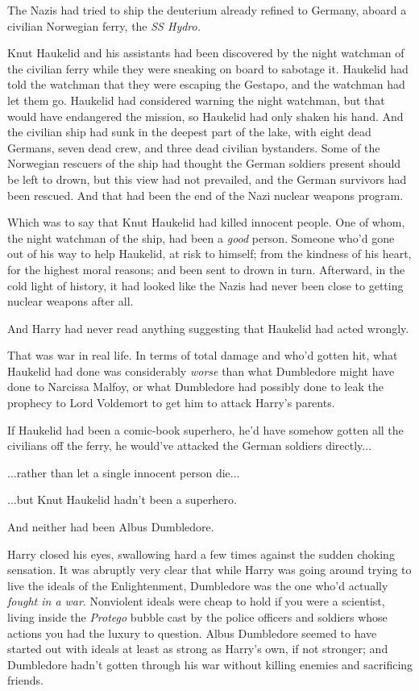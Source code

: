The Nazis had tried to ship the deuterium already refined to Germany, aboard a civilian Norwegian ferry, the \emph{SS Hydro.}

Knut Haukelid and his assistants had been discovered by the night watchman of the civilian ferry while they were sneaking on board to sabotage it. Haukelid had told the watchman that they were escaping the Gestapo, and the watchman had let them go. Haukelid had considered warning the night watchman, but that would have endangered the mission, so Haukelid had only shaken his hand. And the civilian ship had sunk in the deepest part of the lake, with eight dead Germans, seven dead crew, and three dead civilian bystanders. Some of the Norwegian rescuers of the ship had thought the German soldiers present should be left to drown, but this view had not prevailed, and the German survivors had been rescued. And that had been the end of the Nazi nuclear weapons program.

Which was to say that Knut Haukelid had killed innocent people. One of whom, the night watchman of the ship, had been a \emph{good} person. Someone who'd gone out of his way to help Haukelid, at risk to himself; from the kindness of his heart, for the highest moral reasons; and been sent to drown in turn. Afterward, in the cold light of history, it had looked like the Nazis had never been close to getting nuclear weapons after all.

And Harry had never read anything suggesting that Haukelid had acted wrongly.

That was war in real life. In terms of total damage and who'd gotten hit, what Haukelid had done was considerably \emph{worse} than what Dumbledore might have done to Narcissa Malfoy, or what Dumbledore had possibly done to leak the prophecy to Lord Voldemort to get him to attack Harry's parents.

If Haukelid had been a comic-book superhero, he'd have somehow gotten all the civilians off the ferry, he would've attacked the German soldiers directly...

...rather than let a single innocent person die...

...but Knut Haukelid hadn't been a superhero.

And neither had been Albus Dumbledore.

Harry closed his eyes, swallowing hard a few times against the sudden choking sensation. It was abruptly very clear that while Harry was going around trying to live the ideals of the Enlightenment, Dumbledore was the one who'd actually \emph{fought in a war}. Nonviolent ideals were cheap to hold if you were a scientist, living inside the \emph{Protego} bubble cast by the police officers and soldiers whose actions you had the luxury to question. Albus Dumbledore seemed to have started out with ideals at least as strong as Harry's own, if not stronger; and Dumbledore hadn't gotten through his war without killing enemies and sacrificing friends.

